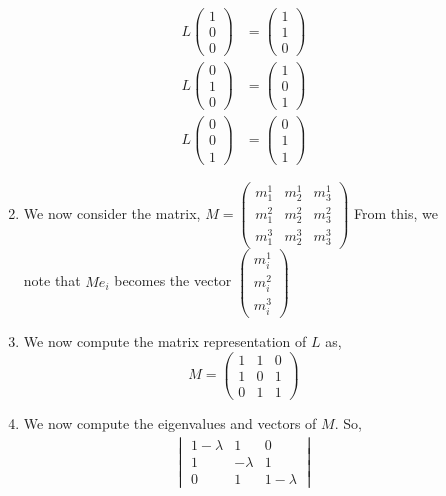 \documentclass[letterpaper,10pt]{article}
\begin{document}
\begin{description}
\begin{enumerate}[label=\alph*.]
\begin{align*}
L\begin{pmatrix}
1\\0\\0
\end{pmatrix} &= \begin{pmatrix}
1\\1\\0
\end{pmatrix}\\
L\begin{pmatrix}
0\\1\\0
\end{pmatrix} &= \begin{pmatrix}
1\\0\\1
\end{pmatrix} \\
L\begin{pmatrix}
0\\0\\1
\end{pmatrix} &= \begin{pmatrix}
0\\1\\1
\end{pmatrix}
\end{align*}
\item We now consider the matrix, $M=\begin{pmatrix}
m_1^1 & m_2^1 & m_3^1\\
m_1^2 & m_2^2 & m_3^2\\
m_1^3 & m_2^3 & m_3^3
\end{pmatrix}$ From this, we note that $Me_i$ becomes the vector $\begin{pmatrix}
m_i^1\\m_i^2\\m_i^3
\end{pmatrix} $
\item We now compute the matrix representation of $L$ as,
\[M=\begin{pmatrix}
1 & 1 & 0\\
1 & 0 & 1\\
0 & 1 & 1
\end{pmatrix}\]
\item We now compute the eigenvalues and vectors of $M$. So,
\begin{align*}
\begin{vmatrix}
1-\lambda & 1 & 0\\
1 & -\lambda & 1\\
0 & 1 & 1-\lambda

\end{vmatrix}
\end{align*}
\end{enumerate}
\end{description}
\end{document}
